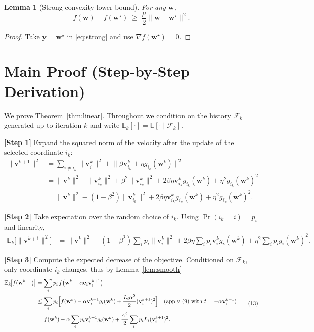 \documentclass[11pt]{article}
\newtheorem{lemma}{Lemma}
\newcommand{\E}{\mathbb{E}}
\begin{document}
\begin{lemma}[Strong convexity lower bound]\label{lem:strong}
For any $\mathbf w$,
\[
f(\mathbf w)-f(\mathbf w^{\star})\;\ge\;\frac{\mu}{2}\|\mathbf w-\mathbf w^{\star}\|^{2}.
\tag{10}
\]
\end{lemma}
\begin{proof}
Take $\mathbf y=\mathbf w^{\star}$ in \eqref{eq:strong} and use $\nabla f(\mathbf w^{\star})=0$.
\end{proof}

\section*{Main Proof (Step‑by‑Step Derivation)}
We prove Theorem~\ref{thm:linear}.  Throughout we condition on the
history $\mathcal F_{k}$ generated up to iteration $k$ and write
$\E_{k}[\cdot]=\E[\cdot\mid\mathcal F_{k}]$.

\noindent\textbf{[Step 1]}   Expand the squared norm of the velocity after the update of the selected coordinate $i_k$:
\[
\begin{aligned}
\|\mathbf v^{k+1}\|^{2}
&= \sum_{i\neq i_k}\|\mathbf v^{k}_{i}\|^{2}
   +\bigl\|\beta\mathbf v^{k}_{i_k}+ \eta g_{i_k}(\mathbf w^{k})\bigr\|^{2}\\
&= \|\mathbf v^{k}\|^{2}
   -\|\mathbf v^{k}_{i_k}\|^{2}
   +\beta^{2}\|\mathbf v^{k}_{i_k}\|^{2}
   +2\beta\eta \mathbf v^{k}_{i_k} g_{i_k}(\mathbf w^{k})
   +\eta^{2}g_{i_k}(\mathbf w^{k})^{2}\\
&= \|\mathbf v^{k}\|^{2}
   - (1-\beta^{2})\|\mathbf v^{k}_{i_k}\|^{2}
   +2\beta\eta \mathbf v^{k}_{i_k} g_{i_k}(\mathbf w^{k})
   +\eta^{2}g_{i_k}(\mathbf w^{k})^{2}.
\end{aligned}
\tag{11}
\]

\noindent\textbf{[Step 2]}   Take expectation over the random choice of $i_k$.
Using $\Pr(i_k=i)=p_i$ and linearity,
\[
\begin{aligned}
\E_{k}\!\bigl[\|\mathbf v^{k+1}\|^{2}\bigr]
&= \|\mathbf v^{k}\|^{2}
   - (1-\beta^{2})\sum_{i}p_i\|\mathbf v^{k}_{i}\|^{2}
   +2\beta\eta\sum_{i}p_i\mathbf v^{k}_{i} g_i(\mathbf w^{k})
   +\eta^{2}\sum_{i}p_i g_i(\mathbf w^{k})^{2}.
\end{aligned}
\tag{12}
\]

\noindent\textbf{[Step 3]}   Compute the expected decrease of the objective.
Conditioned on $\mathcal F_k$, only coordinate $i_k$ changes, thus by Lemma~\ref{lem:smooth}
\[
\begin{aligned}
\E_{k}\!\bigl[f(\mathbf w^{k+1})\bigr]
&= \sum_{i}p_i\,
   f\bigl(\mathbf w^{k}-\alpha\mathbf e_i\mathbf v^{k+1}_{i}\bigr)\\
&\le \sum_{i}p_i\Bigl[
    f(\mathbf w^{k})
    -\alpha\mathbf v^{k+1}_{i}g_i(\mathbf w^{k})
    +\frac{L_i\alpha^{2}}{2}(\mathbf v^{k+1}_{i})^{2}
   \Bigr]  \quad\text{(apply (9) with }t=-\alpha\mathbf v^{k+1}_{i})\\
&= f(\mathbf w^{k})
   -\alpha\sum_{i}p_i\mathbf v^{k+1}_{i} g_i(\mathbf w^{k})
   +\frac{\alpha^{2}}{2}\sum_{i}p_i L_i(\mathbf v^{k+1}_{i})^{2}.
\end{aligned}
\tag{13}
\]
\end{document}
